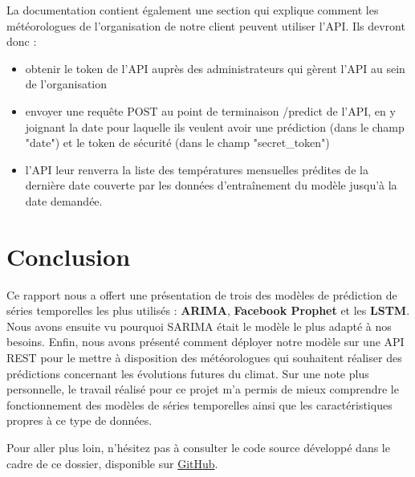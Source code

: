 \documentclass[french]{article}
\begin{document}
    La documentation contient également une section qui explique comment les météorologues de l'organisation de notre client peuvent utiliser l'API. Ils devront donc :
    \begin{itemize}
        \item obtenir le token de l'API auprès des administrateurs qui gèrent l'API au sein de l'organisation
        \item envoyer une requête POST au point de terminaison /predict de l'API, en y joignant la date pour laquelle ils veulent avoir une prédiction (dans le champ "date") et le token de sécurité (dans le champ "secret\_token")
        \item l'API leur renverra la liste des températures mensuelles prédites de la dernière date couverte par les données d'entraînement du modèle jusqu'à la date demandée.
    \end{itemize}

    \section*{Conclusion}
    Ce rapport nous a offert une présentation de trois des modèles de prédiction de séries temporelles les plus utilisés : \textbf{ARIMA}, \textbf{Facebook Prophet} et les \textbf{LSTM}. Nous avons ensuite vu pourquoi SARIMA était le modèle le plus adapté à nos besoins. Enfin, nous avons présenté comment déployer notre modèle sur une API REST pour le mettre à disposition des météorologues qui souhaitent réaliser des prédictions concernant les évolutions futures du climat.
    Sur une note plus personnelle, le travail réalisé pour ce projet m'a permis de mieux comprendre le fonctionnement des modèles de séries temporelles ainsi que les caractéristiques propres à ce type de données.

    Pour aller plus loin, n'hésitez pas à consulter le code source développé dans le cadre de ce dossier, disponible sur \href{https://github.com/vinpap/predict_climate_change}{GitHub}.

\end{document}
